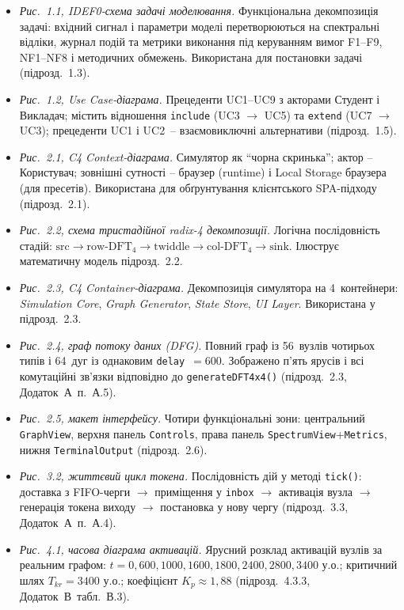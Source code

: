 \documentclass[
]{article}
\begin{document}
\begin{itemize}
\item
  \emph{Рис.~1.1, IDEF0-схема задачі моделювання.} Функціональна
  декомпозиція задачі: вхідний сигнал і параметри моделі
  перетворюються на спектральні відліки, журнал подій та метрики
  виконання під керуванням вимог F1--F9, NF1--NF8 і методичних
  обмежень. Використана для постановки задачі (підрозд.~1.3).
\item
  \emph{Рис.~1.2, Use Case-діаграма.} Прецеденти UC1--UC9 з акторами
  Студент і Викладач; містить відношення \texttt{include} (UC3 \(\to\)
  UC5) та \texttt{extend} (UC7 \(\to\) UC3); прецеденти UC1 і UC2~--
  взаємовиключні альтернативи (підрозд.~1.5).
\item
  \emph{Рис.~2.1, C4 Context-діаграма.} Симулятор як ``чорна скринька'';
  актор -- Користувач; зовнішні сутності -- браузер (runtime) і Local
  Storage браузера (для пресетів). Використана для обґрунтування
  клієнтського SPA-підходу (підрозд.~2.1).
\item
  \emph{Рис.~2.2, схема тристадійної radix-4 декомпозиції.} Логічна
  послідовність стадій:
  \(\text{src} \to \text{row-DFT}_4 \to \text{twiddle} \to
  \text{col-DFT}_4 \to \text{sink}\). Ілюструє математичну модель
  підрозд.~2.2.
\item
  \emph{Рис.~2.3, C4 Container-діаграма.} Декомпозиція симулятора на
  4~контейнери: \emph{Simulation Core}, \emph{Graph Generator},
  \emph{State Store}, \emph{UI Layer}. Використана у підрозд.~2.3.
\item
  \emph{Рис.~2.4, граф потоку даних (DFG).} Повний граф із 56~вузлів
  чотирьох типів і 64~дуг із однаковим \texttt{delay}~\(= 600\).
  Зображено п'ять ярусів і всі комутаційні зв'язки відповідно до
  \texttt{generateDFT4x4()} (підрозд.~2.3, Додаток~А~п.~А.5).
\item
  \emph{Рис.~2.5, макет інтерфейсу.} Чотири функціональні зони:
  центральний \texttt{GraphView}, верхня панель \texttt{Controls},
  права панель \texttt{SpectrumView}+\texttt{Metrics}, нижня
  \texttt{TerminalOutput} (підрозд.~2.6).
\item
  \emph{Рис.~3.2, життєвий цикл токена.} Послідовність дій у методі
  \texttt{tick()}: доставка з FIFO-черги \(\to\) приміщення у
  \texttt{inbox} \(\to\) активація вузла \(\to\) генерація токена
  виходу \(\to\) постановка у нову чергу (підрозд.~3.3, Додаток~А~п.~А.4).
\item
  \emph{Рис.~4.1, часова діаграма активацій.} Ярусний розклад активацій
  вузлів за реальним графом: \(t = 0,600,1000,1600,1800,2400,2800,3400\)
  у.о.; критичний шлях \(T_{kr} = 3400\) у.о.; коефіцієнт
  \(K_{p} \approx 1{,}88\) (підрозд.~4.3.3, Додаток~В~табл.~В.3).
\end{itemize}
\end{document}
